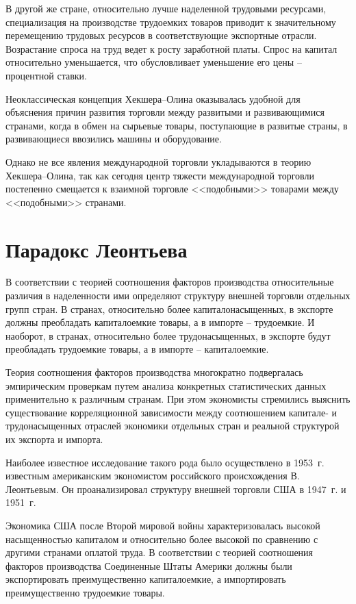 В другой же стране, относительно лучше наделенной трудовыми ресурсами,
специализация на производстве трудоемких товаров приводит к значительному
перемещению трудовых ресурсов в соответствующие экспортные отрасли. Возрастание
спроса на труд ведет к росту заработной платы. Спрос на капитал относительно
уменьшается, что обусловливает уменьшение его цены -- процентной ставки.

Неоклассическая концепция Хекшера--Олина оказывалась удобной для объяснения
причин развития торговли между развитыми и развивающимися странами, когда в
обмен на сырьевые товары, поступающие в развитые страны, в развивающиеся
ввозились машины и оборудование.

Однако не все явления международной торговли укладываются в теорию
Хекшера--Олина, так как сегодня центр тяжести международной торговли постепенно
смещается к взаимной торговле <<подобными>> товарами между <<подобными>>
странами.

\vspace*{2em} %

\section{Парадокс Леонтьева}

В соответствии с теорией соотношения факторов производства относительные
различия в наделенности ими определяют структуру внешней торговли отдельных
групп стран. В странах, относительно более капиталонасыщенных, в экспорте
должны преобладать капиталоемкие товары, а в импорте -- трудоемкие. И наоборот,
в странах, относительно более трудонасыщенных, в экспорте будут преобладать
трудоемкие товары, а в импорте -- капиталоемкие.

Теория соотношения факторов производства многократно подвергалась эмпирическим
проверкам путем анализа конкретных статистических данных применительно к
различным странам. При этом экономисты стремились выяснить существование
корреляционной зависимости между соотношением капитале- и трудонасыщенных
отраслей экономики отдельных стран и реальной структурой их экспорта и импорта.

Наиболее известное исследование такого рода было осуществлено в 1953~г.
известным американским экономистом российского происхождения В. Леонтьевым. Он
проанализировал структуру внешней торговли США в 1947~г. и 1951~г.

Экономика США после Второй мировой войны характеризовалась высокой
насыщенностью капиталом и относительно более высокой по сравнению с другими
странами оплатой труда. В соответствии с теорией соотношения факторов
производства Соединенные Штаты Америки должны были экспортировать
преимущественно капиталоемкие, а импортировать преимущественно трудоемкие
товары.

